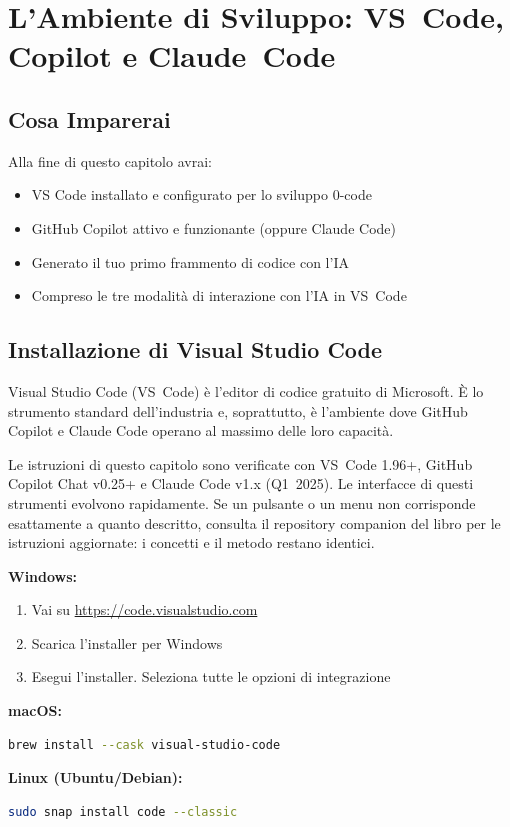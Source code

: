 \chapter{L'Ambiente di Sviluppo: VS~Code, Copilot e Claude~Code}

\section*{Cosa Imparerai}
Alla fine di questo capitolo avrai:
\begin{itemize}
  \item VS Code installato e configurato per lo sviluppo 0-code
  \item GitHub Copilot attivo e funzionante (oppure Claude Code)
  \item Generato il tuo primo frammento di codice con l'IA
  \item Compreso le tre modalità di interazione con l'IA in VS~Code
\end{itemize}

\section{Installazione di Visual Studio Code}

Visual Studio Code (VS~Code) è l'editor di codice gratuito di Microsoft. È lo strumento standard dell'industria e, soprattutto, è l'ambiente dove GitHub Copilot e Claude Code operano al massimo delle loro capacità.

\begin{versionbox}
Le istruzioni di questo capitolo sono verificate con VS~Code 1.96+, GitHub Copilot Chat v0.25+ e Claude Code v1.x (Q1~2025). Le interfacce di questi strumenti evolvono rapidamente. Se un pulsante o un menu non corrisponde esattamente a quanto descritto, consulta il repository companion del libro per le istruzioni aggiornate: i concetti e il metodo restano identici.
\end{versionbox}

\begin{praticabox}[title={Pratica --- Installazione VS Code}]
\textbf{Windows:}
\begin{enumerate}
  \item Vai su \url{https://code.visualstudio.com}
  \item Scarica l'installer per Windows
  \item Esegui l'installer. Seleziona tutte le opzioni di integrazione
\end{enumerate}

\textbf{macOS:}
\begin{lstlisting}[language=bash]
brew install --cask visual-studio-code
\end{lstlisting}

\textbf{Linux (Ubuntu/Debian):}
\begin{lstlisting}[language=bash]
sudo snap install code --classic
\end{lstlisting}
\end{praticabox}

